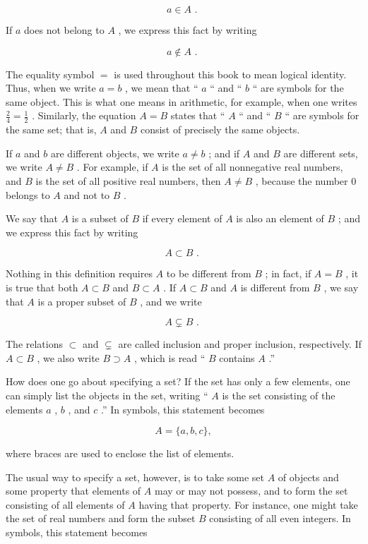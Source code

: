 \[
a \in  A\text{ . }
\]

If \(a\) does not belong to \(A\) , we express this fact by writing

\[
a \notin  A\text{ . }
\]

The equality symbol \(=\) is used throughout this book to mean logical identity. Thus, when we write \(a = b\) , we mean that `` \(a\) `` and `` \(b\) `` are symbols for the same object. This is what one means in arithmetic, for example, when one writes \(\frac{2}{4} = \frac{1}{2}\) . Similarly, the equation \(A = B\) states that `` \(A\) `` and `` \(B\) `` are symbols for the same set; that is, \(A\) and \(B\) consist of precisely the same objects.

If \(a\) and \(b\) are different objects, we write \(a \neq  b\) ; and if \(A\) and \(B\) are different sets, we write \(A \neq  B\) . For example, if \(A\) is the set of all nonnegative real numbers, and \(B\) is the set of all positive real numbers, then \(A \neq  B\) , because the number 0 belongs to \(A\) and not to \(B\) .

We say that \(A\) is a subset of \(B\) if every element of \(A\) is also an element of \(B\) ; and we express this fact by writing

\[
A \subset  B\text{ . }
\]

Nothing in this definition requires \(A\) to be different from \(B\) ; in fact, if \(A = B\) , it is true that both \(A \subset  B\) and \(B \subset  A\) . If \(A \subset  B\) and \(A\) is different from \(B\) , we say that \(A\) is a proper subset of \(B\) , and we write

\[
A \varsubsetneq  B\text{ . }
\]

The relations \(\subset\) and \(\varsubsetneq\) are called inclusion and proper inclusion, respectively. If \(A \subset  B\) , we also write \(B \supset  A\) , which is read `` \(B\) contains \(A\) .''

How does one go about specifying a set? If the set has only a few elements, one can simply list the objects in the set, writing `` \(A\) is the set consisting of the elements \(a\) , \(b\) , and \(c\) .'' In symbols, this statement becomes

\[
A = \{ a,b,c\} ,
\]

where braces are used to enclose the list of elements.

The usual way to specify a set, however, is to take some set \(A\) of objects and some property that elements of \(A\) may or may not possess, and to form the set consisting of all elements of \(A\) having that property. For instance, one might take the set of real numbers and form the subset \(B\) consisting of all even integers. In symbols, this statement becomes

